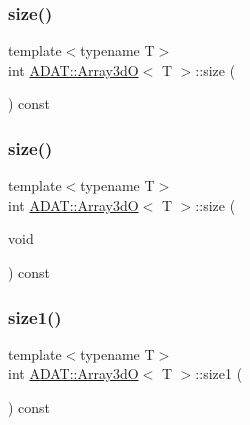 \mbox{\label{classADAT_1_1Array3dO_a44da6abc6d1597d9df0b983691b952fc}} 
\subsubsection{\texorpdfstring{size()}{size()}\hspace{0.1cm}{\footnotesize\ttfamily [2/3]}}
{\footnotesize\ttfamily template$<$typename T$>$ \\
int \mbox{\hyperlink{classADAT_1_1Array3dO}{A\+D\+A\+T\+::\+Array3dO}}$<$ T $>$\+::size (\begin{DoxyParamCaption}{ }\end{DoxyParamCaption}) const\hspace{0.3cm}{\ttfamily [inline]}}

\mbox{\label{classADAT_1_1Array3dO_a44da6abc6d1597d9df0b983691b952fc}} 
\subsubsection{\texorpdfstring{size()}{size()}\hspace{0.1cm}{\footnotesize\ttfamily [3/3]}}
{\footnotesize\ttfamily template$<$typename T$>$ \\
int \mbox{\hyperlink{classADAT_1_1Array3dO}{A\+D\+A\+T\+::\+Array3dO}}$<$ T $>$\+::size (\begin{DoxyParamCaption}\item[{void}]{ }\end{DoxyParamCaption}) const\hspace{0.3cm}{\ttfamily [inline]}}

\mbox{\label{classADAT_1_1Array3dO_a30149908b955c7eeebec86a24e6afffd}} 
\subsubsection{\texorpdfstring{size1()}{size1()}\hspace{0.1cm}{\footnotesize\ttfamily [1/3]}}
{\footnotesize\ttfamily template$<$typename T$>$ \\
int \mbox{\hyperlink{classADAT_1_1Array3dO}{A\+D\+A\+T\+::\+Array3dO}}$<$ T $>$\+::size1 (\begin{DoxyParamCaption}{ }\end{DoxyParamCaption}) const\hspace{0.3cm}{\ttfamily [inline]}}

